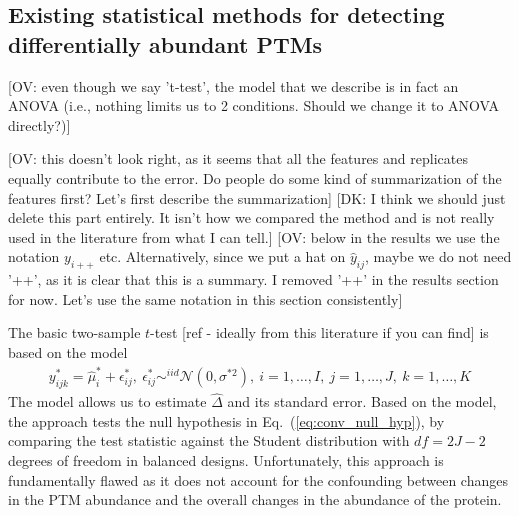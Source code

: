 \documentclass[mcp]{article}
\numberwithin{table}{section}
\def\todo#1{{\color{red}[#1]}}
\def\eqref#1{Eq.~(\ref{eq:#1})}
\begin{document}
\subsection*{Existing statistical methods for detecting differentially abundant PTMs}

\todo{OV: even though we say 't-test', the model that we describe is in fact an ANOVA (i.e., nothing limits us to 2 conditions. Should we change it to ANOVA directly?)}


\medskip \noindent 
\todo{OV: this doesn't look right, as it seems that all the features and replicates equally contribute to the error. Do people do some kind of summarization of the features first? Let's first describe the summarization}
\todo{DK: I think we should just delete this part entirely. It isn't how we compared the method and is not really used in the literature from what I can tell.} \todo{OV: below in the results we use the notation $y_{i++}$ etc. Alternatively, since we put a hat on $\hat{y}_{ij}$, maybe we do not need '++', as it is clear that this is a summary. I removed '++' in the results section for now. Let's use the same notation in this section consistently}

The basic two-sample $t$-test \todo{ref - ideally from this literature if you can find} is based on the model
\begin{eqnarray}
y^*_{ijk} = \hat{\mu}^{*}_{i} + \epsilon^{\ast}_{ij}, \ \epsilon^{\ast}_{ij} \mathop\sim^{iid} \mathcal{N}(0, \sigma^{*2}),\ i=1,\ldots,I,\ j=1,\ldots,J,\ k=1,\ldots,K
\label{eq:ttest_model}
\end{eqnarray}
The model allows us to estimate $\hat{\Delta}$ and its standard error.
Based on the model, the approach tests the null hypothesis in \eqref{conv_null_hyp}, by comparing the test statistic against the Student distribution with $df=2J-2$ degrees of freedom in balanced designs.
Unfortunately, this approach is fundamentally flawed as it does not account for the confounding between changes in the PTM abundance and the overall changes in the abundance of the protein.

\medskip \noindent 

\end{document}
